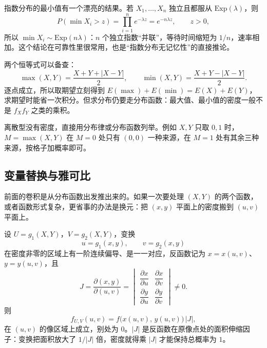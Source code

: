 指数分布的最小值有一个漂亮的结果。若 $X_1,\dots,X_n$ 独立且都服从 $\mathrm{Exp}(\lambda)$，则
\[
P(\min X_i>z)=\prod_{i=1}^{n}e^{-\lambda z}=e^{-n\lambda z},\qquad z>0,
\]
所以 $\min X_i\sim\mathrm{Exp}(n\lambda)$：$n$ 个独立指数“并联”，等待时间缩短为 $1/n$，速率相加。这个结论在可靠性里很常用，也是“指数分布无记忆性”的直接推论。

两个恒等式可以备查：
\[
\max(X,Y)=\frac{X+Y+|X-Y|}{2},\qquad
\min(X,Y)=\frac{X+Y-|X-Y|}{2}.
\]
逐点成立，所以取期望立刻得到 $E(\max)+E(\min)=E(X)+E(Y)$，求期望时能省一次积分。但求分布仍要走分布函数：最大值、最小值的密度一般不是 $f_Xf_Y$ 之类的乘积。

离散型没有密度，直接用分布律或分布函数列举。例如 $X,Y$ 只取 $0,1$ 时，$M=\max(X,Y)$ 在 $M=0$ 处只有 $(0,0)$ 一种来源，在 $M=1$ 处有其余三种来源，按格子加概率即可。

\subsection{变量替换与雅可比}

前面的卷积是从分布函数出发推出来的。如果一次要处理 $(X,Y)$ 的两个函数，或者函数形式复杂，更省事的办法是换元：把 $(x,y)$ 平面上的密度搬到 $(u,v)$ 平面上。

设 $U=g_1(X,Y)$，$V=g_2(X,Y)$，变换
\[
u=g_1(x,y),\qquad v=g_2(x,y)
\]
在密度非零的区域上有一阶连续偏导、是一一对应，反函数记为 $x=x(u,v)$、$y=y(u,v)$，且
\[
J=\frac{\partial(x,y)}{\partial(u,v)}
=\begin{vmatrix}
\dfrac{\partial x}{\partial u} & \dfrac{\partial x}{\partial v}\\[8pt]
\dfrac{\partial y}{\partial u} & \dfrac{\partial y}{\partial v}
\end{vmatrix}\ne 0 .
\]
则
\[
f_{U,V}(u,v)=f\bigl(x(u,v),\,y(u,v)\bigr)\,\bigl|J\bigr| ,
\]
在 $(u,v)$ 的像区域上成立，别处为 $0$。$|J|$ 是反函数在原像点处的面积伸缩因子：变换把面积放大了 $1/|J|$ 倍，密度就得乘 $|J|$ 才能保持总概率为 $1$。

